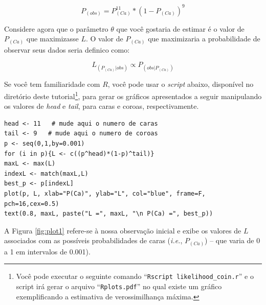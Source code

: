 \begin{refsection}
\begin{equation} \label{eq:prob3}
P_{(obs)} = P_{(Ca)}^{11}*(1-P_{(Ca)})^9
\end{equation}


Considere agora que o parâmetro $\theta$ que você gostaria de estimar é o valor de $P_{(Ca)}$ que maximizasse $L$. O valor de $P_{(Ca)}$ que maximizaria a probabilidade de observar seus dados seria definico como: 

\begin{equation} \label{eq:ml2}
L_{(P_{(Ca)} | obs)} \propto P_{(obs | P_{(Ca)})}
\end{equation}

Se você tem familiaridade com $R$, você pode usar o \textit{script} abaixo, disponível no diretório deste tutorial\footnote{ Você pode executar o seguinte comando ``\texttt{Rscript likelihood\_coin.r}'' e o script irá gerar o arquivo ``\texttt{Rplots.pdf}'' no qual existe um gráfico exemplificando a estimativa de verossimilhança máxima.}, para gerar os gráficos apresentados a seguir manipulando os valores de \textit{head} e \textit{tail}, para caras e coroas, respectivamente.
\scriptsize
\begin{lstlisting}[label=tut3:ls1]
head <- 11   # mude aqui o numero de caras
tail <- 9   # mude aqui o numero de coroas
p <- seq(0,1,by=0.001)
for (i in p){L <- c((p^head)*(1-p)^tail)}
maxL <- max(L)
indexL <- match(maxL,L)
best_p <- p[indexL]
plot(p, L, xlab="P(Ca)", ylab="L", col="blue", frame=F, pch=16,cex=0.5)
text(0.8, maxL, paste("L =", maxL, "\n P(Ca) =", best_p))
\end{lstlisting}
\normalsize
A Figura \ref{fig:plot1} refere-se à nossa observação inicial e exibe os valores de $L$ associados com as possíveis probabilidades de caras (\textit{i.e.}, $P_{(Ca)}$) -- que varia de 0 a 1 em intervalos de 0.001).



\end{refsection}
